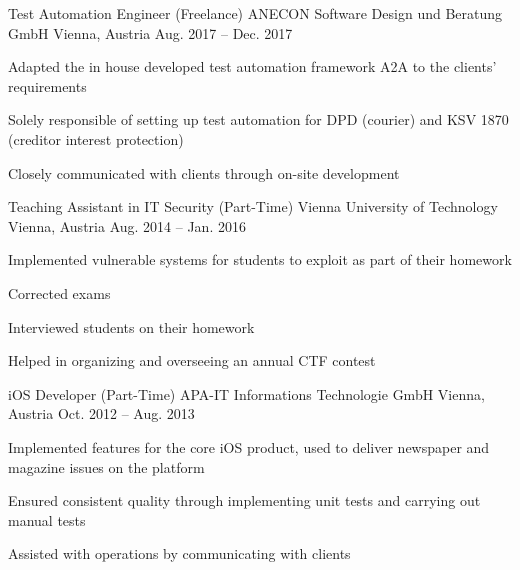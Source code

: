 \begin{cventries}

\cventry
{Test Automation Engineer (Freelance)} %
{ANECON Software Design und Beratung GmbH} %
{Vienna, Austria} %
{Aug. 2017 -- Dec. 2017} %
{ %
\begin{cvitems}
\item {Adapted the in house developed test automation framework A2A to the clients' requirements}
\item {Solely responsible of setting up test automation for DPD (courier) and KSV 1870 (creditor interest protection)}
\item {Closely communicated with clients through on-site development}
\end{cvitems}
}


\cventry
{Teaching Assistant in IT Security (Part-Time)} %
{Vienna University of Technology} %
{Vienna, Austria} %
{Aug. 2014 -- Jan. 2016} %
{ %
\begin{cvitems}
\item {Implemented vulnerable systems for students to exploit as part of their homework}
\item {Corrected exams}
\item {Interviewed students on their homework}
\item {Helped in organizing and overseeing an annual CTF contest}
\end{cvitems}
}


\cventry
{iOS Developer (Part-Time)} %
{APA-IT Informations Technologie GmbH} %
{Vienna, Austria} %
{Oct. 2012 -- Aug. 2013} %
{ %
\begin{cvitems}
\item {Implemented features for the core iOS product, used to deliver newspaper and magazine issues on the platform}
\item {Ensured consistent quality through implementing unit tests and carrying out manual tests}
\item {Assisted with operations by communicating with clients}
\end{cvitems}
}


\end{cventries}